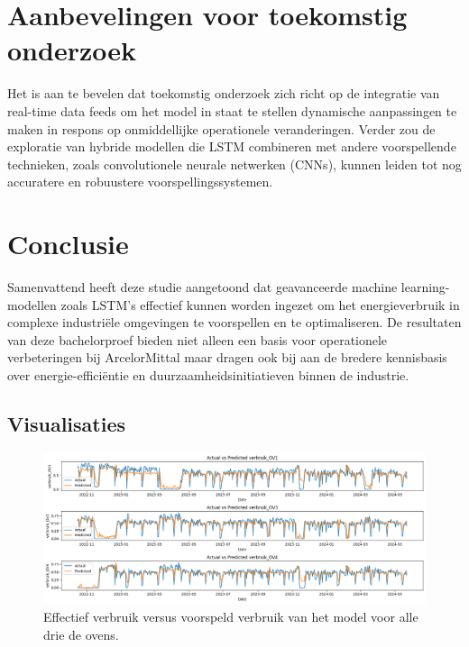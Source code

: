 \section{Aanbevelingen voor toekomstig onderzoek}
Het is aan te bevelen dat toekomstig onderzoek zich richt op de integratie van real-time data feeds om het model in staat te stellen dynamische aanpassingen te maken in respons op onmiddellijke operationele veranderingen. Verder zou de exploratie van hybride modellen die LSTM combineren met andere voorspellende technieken, zoals convolutionele neurale netwerken (CNNs), kunnen leiden tot nog accuratere en robuustere voorspellingssystemen.

\section{Conclusie}
Samenvattend heeft deze studie aangetoond dat geavanceerde machine learning-modellen zoals LSTM's effectief kunnen worden ingezet om het energieverbruik in complexe industriële omgevingen te voorspellen en te optimaliseren. De resultaten van deze bachelorproef bieden niet alleen een basis voor operationele verbeteringen bij ArcelorMittal maar dragen ook bij aan de bredere kennisbasis over energie-efficiëntie en duurzaamheidsinitiatieven binnen de industrie.

\subsection{Visualisaties}
\begin{figure}[h!]
    \centering
    \includegraphics[width=\textwidth]{graphics/ActualVSPredicted.png}
    \caption{Effectief verbruik versus voorspeld verbruik van het model voor alle drie de ovens.}
    \label{fig:ActualVSPredicted}
\end{figure}
